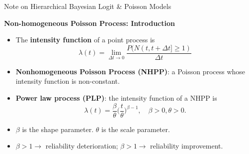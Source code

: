 \documentclass[aspectratio=43]{beamer}
\begin{document}
\begin{frame}{Note on Hierarchical Bayesian Logit \& Poisson Models}
{}


\end{frame}

\begin{frame}{\textbf{Non-homogeneous Poisson Process: Introduction}}
\begin{itemize}
    \item The \textbf{intensity function} of a point process is \begin{equation}
        \lambda(t) = \lim_{\Delta t \rightarrow 0}\frac{P(N(t, t+\Delta t] \geq 1)}{\Delta t} \tag{4}
    \end{equation}
    \item \textbf{Nonhomogeneous Poisson Process (NHPP)}: a Poisson process whose intensity function is non-constant.
    \item \textbf{Power law process (PLP)}: the intensity function of a NHPP is \begin{equation}
        \lambda(t) = \frac{\beta}{\theta}\bigg(\frac{t}{\theta}\bigg)^{\beta-1}, \quad \beta > 0, \theta > 0. \tag{5}
    \end{equation}
    \item $\beta$ is the shape parameter.  $\theta$ is the scale parameter.
    \item $\beta > 1 \rightarrow$ reliability deterioration; $\beta > 1 \rightarrow$ reliability improvement.
\end{itemize}
\end{frame}
\end{document}
